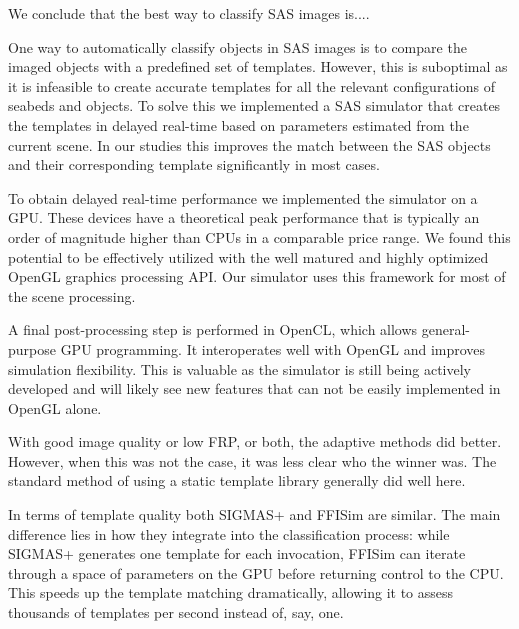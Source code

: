 
We conclude that the best way to classify SAS images is....

One way to automatically classify objects in SAS images is to compare the imaged objects with a predefined set of templates. However, this is suboptimal as it is infeasible to create accurate templates for all the relevant configurations of seabeds and objects. To solve this we implemented a SAS simulator that creates the templates in delayed real-time based on parameters estimated from the current scene. In our studies this improves the match between the SAS objects and their corresponding template significantly in most cases.

To obtain delayed real-time performance we implemented the simulator on a GPU. These devices have a theoretical peak performance that is typically an order of magnitude higher than CPUs in a comparable price range. We found this potential to be effectively utilized with the well matured and highly optimized OpenGL graphics processing API. Our simulator uses this framework for most of the scene processing.

A final post-processing step is performed in OpenCL, which allows general-purpose GPU programming. It interoperates well with OpenGL and improves simulation flexibility. This is valuable as the simulator is still being actively developed and will likely see new features that can not be easily implemented in OpenGL alone.

With good image quality or low FRP, or both, the adaptive methods did better. However, when this was not the case, it was less clear who the winner was. The standard method of using a static template library generally did well here.

In terms of template quality both SIGMAS+ and FFISim are similar. The main difference lies in how they integrate into the classification process: while SIGMAS+ generates one template for each invocation, FFISim can iterate through a space of parameters on the GPU before returning control to the CPU. This speeds up the template matching dramatically, allowing it to assess thousands of templates per second instead of, say, one. 
 
%

